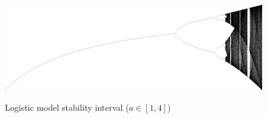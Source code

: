 \documentclass[12pt]{article}
\theoremstyle{plain}
\begin{document}
\begin{figure}[H]
\begin{center}
\includegraphics[width=0.4\textheight]{figure/section1/logistic-stability.png} \\
\caption{Logistic model stability interval ($a \in [1, 4]$)}\label{Logistic-stability}
\end{center}
\end{figure}
\end{document}
